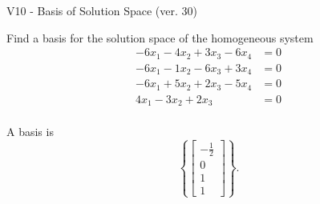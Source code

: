 \begin{exercise}
  \begin{exerciseTitle}V10 - Basis of Solution Space (ver. 30)\end{exerciseTitle}
  \begin{exerciseStatement}
    Find a basis for the solution space of the homogeneous system 
\begin{align*}
 -6 x_ 1 -4 x_ 2 + 3 x_ 3 -6 x_ 4 &= 0  \\ 
  -6 x_ 1 -1 x_ 2 -6 x_ 3 + 3 x_ 4 &= 0  \\ 
  -6 x_ 1 + 5 x_ 2 + 2 x_ 3 -5 x_ 4 &= 0  \\ 
  4 x_ 1 -3 x_ 2 + 2 x_ 3 &= 0  \\ 
 \end{align*}


 
  \end{exerciseStatement}

  \begin{exerciseAnswer}
   A basis is   
\[\left\{\left[\begin{array}{c}
-\frac{1}{2} \\
0 \\
1 \\
1
\end{array}\right]\right\}.\]

  


  \end{exerciseAnswer}
\end{exercise}